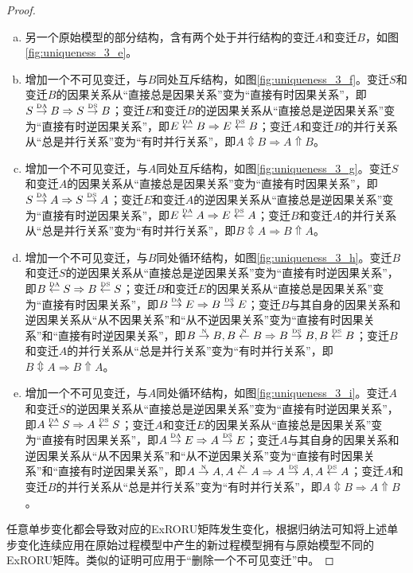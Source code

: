 \begin{proof}
\begin{enumerate}[(a)]
  \item 另一个原始模型的部分结构，含有两个处于并行结构的变迁$A$和变迁$B$，如图\ref{fig:uniqueness_3_e}。
  \item 增加一个不可见变迁，与$B$同处互斥结构，如图\ref{fig:uniqueness_3_f}。变迁$S$和变迁$B$的因果关系从“直接总是因果关系”变为“直接有时因果关系”，即$S\overset{\text{\tiny{DA}}}{\rightarrow}B\Rightarrow S\overset{\text{\tiny{DS}}}{\rightarrow}B$；变迁$E$和变迁$B$的逆因果关系从“直接总是逆因果关系”变为“直接有时逆因果关系”，即$E\overset{\text{\tiny{DA}}}{\leftarrow}B\Rightarrow E\overset{\text{\tiny{DS}}}{\leftarrow}B$；变迁$A$和变迁$B$的并行关系从“总是并行关系”变为“有时并行关系”，即$A\Updownarrow B\Rightarrow A\Uparrow B$。
  \item 增加一个不可见变迁，与$A$同处互斥结构，如图\ref{fig:uniqueness_3_g}。变迁$S$和变迁$A$的因果关系从“直接总是因果关系”变为“直接有时因果关系”，即$S\overset{\text{\tiny{DA}}}{\rightarrow}A\Rightarrow S\overset{\text{\tiny{DS}}}{\rightarrow}A$；变迁$E$和变迁$A$的逆因果关系从“直接总是逆因果关系”变为“直接有时逆因果关系”，即$E\overset{\text{\tiny{DA}}}{\leftarrow}A\Rightarrow E\overset{\text{\tiny{DS}}}{\leftarrow}A$；变迁$B$和变迁$A$的并行关系从“总是并行关系”变为“有时并行关系”，即$B\Updownarrow A\Rightarrow B\Uparrow A$。
  \item 增加一个不可见变迁，与$B$同处循环结构，如图\ref{fig:uniqueness_3_h}。变迁$B$和变迁$S$的逆因果关系从“直接总是逆因果关系”变为“直接有时逆因果关系”，即$B\overset{\text{\tiny{DA}}}{\leftarrow}S\Rightarrow B\overset{\text{\tiny{DS}}}{\leftarrow}S$；变迁$B$和变迁$E$的因果关系从“直接总是因果关系”变为“直接有时因果关系”，即$B\overset{\text{\tiny{DA}}}{\rightarrow}E\Rightarrow B\overset{\text{\tiny{DS}}}{\rightarrow}E$；变迁$B$与其自身的因果关系和逆因果关系从“从不因果关系”和“从不逆因果关系”变为“直接有时因果关系”和“直接有时逆因果关系”，即$B\overset{\text{\tiny{N}}}{\rightarrow}B,B\overset{\text{\tiny{N}}}{\leftarrow}B\Rightarrow B\overset{\text{\tiny{DS}}}{\rightarrow}B,B\overset{\text{\tiny{DS}}}{\leftarrow}B$；变迁$B$和变迁$A$的并行关系从“总是并行关系”变为“有时并行关系”，即$B\Updownarrow A\Rightarrow B\Uparrow A$。
  \item 增加一个不可见变迁，与$A$同处循环结构，如图\ref{fig:uniqueness_3_i}。变迁$A$和变迁$S$的逆因果关系从“直接总是逆因果关系”变为“直接有时逆因果关系”，即$A\overset{\text{\tiny{DA}}}{\leftarrow}S\Rightarrow A\overset{\text{\tiny{DS}}}{\leftarrow}S$；变迁$A$和变迁$E$的因果关系从“直接总是因果关系”变为“直接有时因果关系”，即$A\overset{\text{\tiny{DA}}}{\rightarrow}E\Rightarrow A\overset{\text{\tiny{DS}}}{\rightarrow}E$；变迁$A$与其自身的因果关系和逆因果关系从“从不因果关系”和“从不逆因果关系”变为“直接有时因果关系”和“直接有时逆因果关系”，即$A\overset{\text{\tiny{N}}}{\rightarrow}A,A\overset{\text{\tiny{N}}}{\leftarrow}A\Rightarrow A\overset{\text{\tiny{DS}}}{\rightarrow}A,A\overset{\text{\tiny{DS}}}{\leftarrow}A$；变迁$A$和变迁$B$的并行关系从“总是并行关系”变为“有时并行关系”，即$A\Updownarrow B\Rightarrow A\Uparrow B$。
\end{enumerate}
任意单步变化都会导致对应的ExRORU矩阵发生变化，根据归纳法可知将上述单步变化连续应用在原始过程模型中产生的新过程模型拥有与原始模型不同的ExRORU矩阵。类似的证明可应用于“删除一个不可见变迁”中。
\end{proof}

